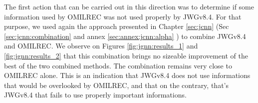\documentclass[../main.tex]{subfiles}
\begin{document}
The first action that can be carried out in this direction was to determine if some information used by OMILREC was not used properly by JWGv8.4. For that purpose, we used again the approach presented in Chapter \ref{sec:jcnn} (Sec \ref{sec:jcnn:combination} and annex \ref{sec:annex:jcnn:alpha} ) to combine JWGv8.4 and OMILREC. We observe on Figures \ref{fig:jgnn:results_1} and \ref{fig:jgnn:results_2} that this combination brings no sizeable improvement  of the best of the two combined methods. The combination remains very close to OMILREC alone. This is an indication that JWGv8.4 does not use informations that would be overlooked by OMILREC, and that on the contrary, that's JWGv8.4 that fails to use properly important informations.

%
%
\end{document}

